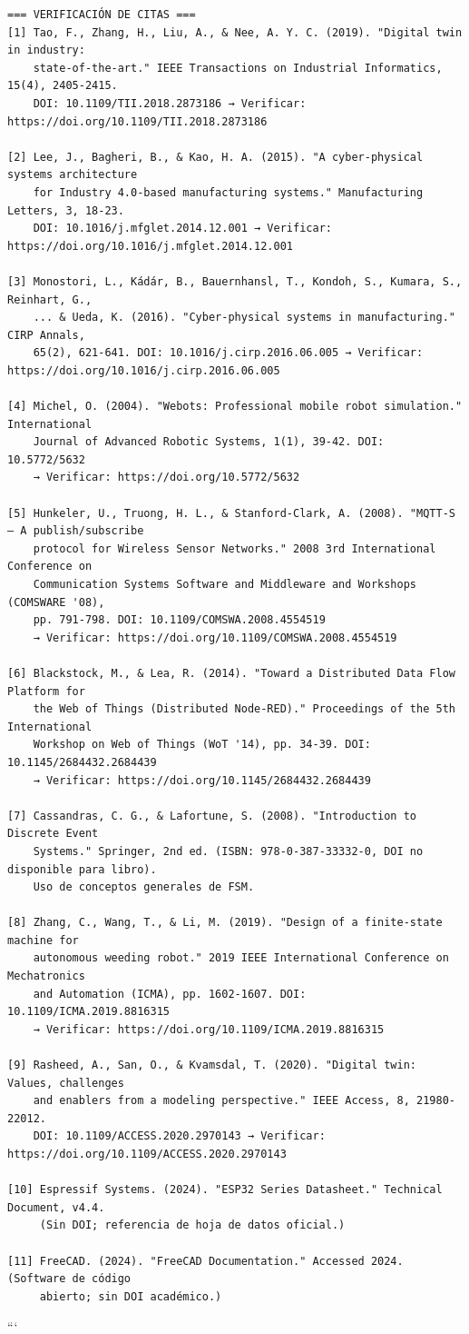\begin{verbatim}
=== VERIFICACIÓN DE CITAS ===
[1] Tao, F., Zhang, H., Liu, A., & Nee, A. Y. C. (2019). "Digital twin in industry: 
    state-of-the-art." IEEE Transactions on Industrial Informatics, 15(4), 2405-2415. 
    DOI: 10.1109/TII.2018.2873186 → Verificar: https://doi.org/10.1109/TII.2018.2873186

[2] Lee, J., Bagheri, B., & Kao, H. A. (2015). "A cyber-physical systems architecture 
    for Industry 4.0-based manufacturing systems." Manufacturing Letters, 3, 18-23.
    DOI: 10.1016/j.mfglet.2014.12.001 → Verificar: https://doi.org/10.1016/j.mfglet.2014.12.001

[3] Monostori, L., Kádár, B., Bauernhansl, T., Kondoh, S., Kumara, S., Reinhart, G., 
    ... & Ueda, K. (2016). "Cyber-physical systems in manufacturing." CIRP Annals, 
    65(2), 621-641. DOI: 10.1016/j.cirp.2016.06.005 → Verificar: https://doi.org/10.1016/j.cirp.2016.06.005

[4] Michel, O. (2004). "Webots: Professional mobile robot simulation." International 
    Journal of Advanced Robotic Systems, 1(1), 39-42. DOI: 10.5772/5632
    → Verificar: https://doi.org/10.5772/5632

[5] Hunkeler, U., Truong, H. L., & Stanford-Clark, A. (2008). "MQTT-S — A publish/subscribe 
    protocol for Wireless Sensor Networks." 2008 3rd International Conference on 
    Communication Systems Software and Middleware and Workshops (COMSWARE '08), 
    pp. 791-798. DOI: 10.1109/COMSWA.2008.4554519
    → Verificar: https://doi.org/10.1109/COMSWA.2008.4554519

[6] Blackstock, M., & Lea, R. (2014). "Toward a Distributed Data Flow Platform for 
    the Web of Things (Distributed Node-RED)." Proceedings of the 5th International 
    Workshop on Web of Things (WoT '14), pp. 34-39. DOI: 10.1145/2684432.2684439
    → Verificar: https://doi.org/10.1145/2684432.2684439

[7] Cassandras, C. G., & Lafortune, S. (2008). "Introduction to Discrete Event 
    Systems." Springer, 2nd ed. (ISBN: 978-0-387-33332-0, DOI no disponible para libro). 
    Uso de conceptos generales de FSM.

[8] Zhang, C., Wang, T., & Li, M. (2019). "Design of a finite-state machine for 
    autonomous weeding robot." 2019 IEEE International Conference on Mechatronics 
    and Automation (ICMA), pp. 1602-1607. DOI: 10.1109/ICMA.2019.8816315
    → Verificar: https://doi.org/10.1109/ICMA.2019.8816315

[9] Rasheed, A., San, O., & Kvamsdal, T. (2020). "Digital twin: Values, challenges 
    and enablers from a modeling perspective." IEEE Access, 8, 21980-22012. 
    DOI: 10.1109/ACCESS.2020.2970143 → Verificar: https://doi.org/10.1109/ACCESS.2020.2970143

[10] Espressif Systems. (2024). "ESP32 Series Datasheet." Technical Document, v4.4. 
     (Sin DOI; referencia de hoja de datos oficial.)

[11] FreeCAD. (2024). "FreeCAD Documentation." Accessed 2024. (Software de código 
     abierto; sin DOI académico.)
\end{verbatim}
```